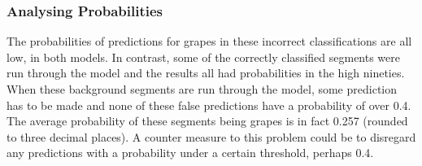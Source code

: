 \subsubsection*{Analysing Probabilities}
The probabilities of predictions for grapes in these incorrect classifications are all low, in both models.
In contrast, some of the correctly classified segments were run through the model and the results all had probabilities in the high nineties.
When these background segments are run through the model, some prediction has to be made and none of these false predictions have a probability of over 0.4.
The average probability of these segments being grapes is in fact 0.257 (rounded to three decimal places).
A counter measure to this problem could be to disregard any predictions with a probability under a certain threshold, perhaps 0.4.


